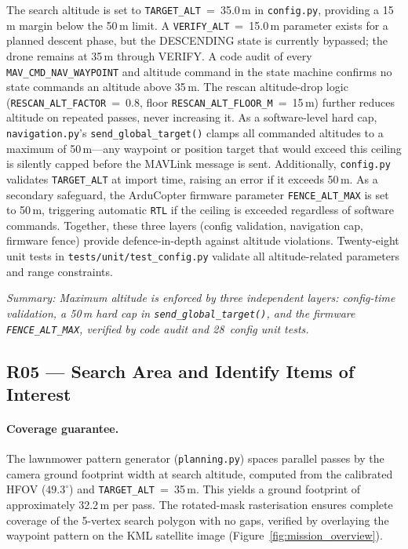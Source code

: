 The search altitude is set to \texttt{TARGET\_ALT}~=~35.0\,m in \texttt{config.py}, providing a 15\,m margin below the 50\,m limit. A \texttt{VERIFY\_ALT}~=~15.0\,m parameter exists for a planned descent phase, but the DESCENDING state is currently bypassed; the drone remains at 35\,m through VERIFY. A code audit of every \texttt{MAV\_CMD\_NAV\_WAYPOINT} and altitude command in the state machine confirms no state commands an altitude above 35\,m. The rescan altitude-drop logic (\texttt{RESCAN\_ALT\_FACTOR}~=~0.8, floor \texttt{RESCAN\_ALT\_FLOOR\_M}~=~15\,m) further reduces altitude on repeated passes, never increasing it. As a software-level hard cap, \texttt{navigation.py}'s \texttt{send\_global\_target()} clamps all commanded altitudes to a maximum of 50\,m---any waypoint or position target that would exceed this ceiling is silently capped before the MAVLink message is sent. Additionally, \texttt{config.py} validates \texttt{TARGET\_ALT} at import time, raising an error if it exceeds 50\,m. As a secondary safeguard, the ArduCopter firmware parameter \texttt{FENCE\_ALT\_MAX} is set to 50\,m, triggering automatic \texttt{RTL} if the ceiling is exceeded regardless of software commands. Together, these three layers (config validation, navigation cap, firmware fence) provide defence-in-depth against altitude violations. Twenty-eight unit tests in \texttt{tests/unit/test\_config.py} validate all altitude-related parameters and range constraints.

\noindent\textit{Summary: Maximum altitude is enforced by three independent layers: config-time validation, a 50\,m hard cap in \texttt{send\_global\_target()}, and the firmware \texttt{FENCE\_ALT\_MAX}, verified by code audit and 28~config unit tests.}

\subsection{R05 --- Search Area and Identify Items of Interest}

\paragraph{Coverage guarantee.} The lawnmower pattern generator (\texttt{planning.py}) spaces parallel passes by the camera ground footprint width at search altitude, computed from the calibrated HFOV ($49.3^{\circ}$) and \texttt{TARGET\_ALT}~=~35\,m. This yields a ground footprint of approximately 32.2\,m per pass. The rotated-mask rasterisation ensures complete coverage of the 5-vertex search polygon with no gaps, verified by overlaying the waypoint pattern on the KML satellite image (Figure~\ref{fig:mission_overview}).

